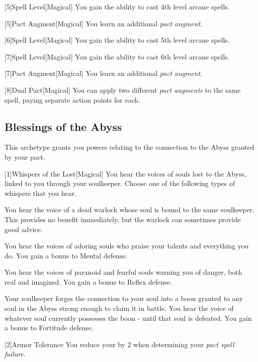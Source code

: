         [5]{Spell Level}[Magical] You gain the ability to cast 4th level arcane spells.

        [5]{Pact Augment}[Magical] You learn an additional \textit{pact augment}.

        [6]{Spell Level}[Magical] You gain the ability to cast 5th level arcane spells.

        [7]{Spell Level}[Magical] You gain the ability to cast 6th level arcane spells.

        [7]{Pact Augment}[Magical] You learn an additional \textit{pact augment}.

        [8]{Dual Pact}[Magical] You can apply two different \textit{pact augments} to the same spell, paying separate action points for each.

    \subsection{Blessings of the Abyss}
        This archetype grants you powers relating to the connection to the Abyss granted by your pact.

        [1]{Whispers of the Lost}[Magical]
        You hear the voices of souls lost to the Abyss, linked to you through your soulkeeper.
        Choose one of the following types of whispers that you hear.
        {
             You hear the voice of a dead warlock whose soul is bound to the same soulkeeper.
            This provides no benefit immediately, but the warlock can sometimes provide good advice.

             You hear the voices of adoring souls who praise your talents and everything you do.
            You gain a  bonus to Mental defense.

             You hear the voices of paranoid and fearful souls warning you of danger, both real and imagined.
            You gain a  bonus to Reflex defense.

             Your soulkeeper forges the connection to your soul into a boon granted to any soul in the Abyss strong enough to claim it in battle.
            You hear the voice of whatever soul currently possesses the boon - until that soul is defeated.
            You gain a  bonus to Fortitude defense.
        }

        [2]{Armor Tolerance} You reduce your  by 2 when determining your \textit{pact spell failure}.

